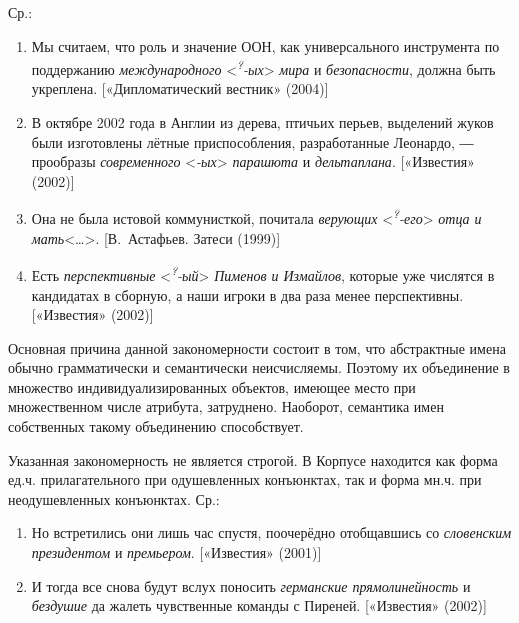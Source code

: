 Ср.:

\begin{enumerate}
\def\labelenumi{(\arabic{enumi})}
\setcounter{enumi}{127}
\item
  Мы считаем, что роль и значение ООН, как универсального инструмента по
  поддержанию \textit{международного}
  \textless{}\textit{\textsuperscript{?}-ых}\textgreater{} \textit{мира} и
  \textit{безопасности}, должна быть укреплена. {[}«Дипломатический
  вестник» (2004){]}
\item
  В октябре 2002 года в Англии из дерева, птичьих перьев, выделений
  жуков были изготовлены лётные приспособления, разработанные Леонардо,
  ― прообразы \textit{современного} \textless{}\textit{-ых}\textgreater{}
  \textit{парашюта} и \textit{дельтаплана}. {[}«Известия» (2002){]}
\item
  Она не была истовой коммунисткой, почитала \textit{верующих}
  \textless{}\textit{\textsuperscript{?}-его}\textgreater{} \textit{отца и
  мать}\textless\ldots\textgreater. {[}В.~Астафьев. Затеси (1999){]}
\item
  Есть \textit{перспективные}
  \textless{}\textit{\textsuperscript{?}-ый}\textgreater{} \textit{Пименов и
  Измайлов}, которые уже числятся в кандидатах в сборную, а наши игроки
  в два раза менее перспективны. {[}«Известия» (2002){]}
\end{enumerate}

Основная причина данной закономерности состоит в том, что абстрактные
имена обычно грамматически и семантически неисчисляемы. Поэтому их
объединение в множество индивидуализированных объектов, имеющее место
при множественном числе атрибута, затруднено. Наоборот, семантика имен
собственных такому объединению способствует.

Указанная закономерность не является строгой. В Корпусе находится как
форма ед.ч. прилагательного при одушевленных конъюнктах, так и форма
мн.ч. при неодушевленных конъюнктах. Ср.:

\begin{enumerate}
\def\labelenumi{(\arabic{enumi})}
\setcounter{enumi}{131}
\item
  Но встретились они лишь час спустя, поочерёдно отобщавшись со
  \textit{словенским президентом} и \textit{премьером}. {[}«Известия»
  (2001){]}
\item
  И тогда все снова будут вслух поносить \textit{германские
  прямолинейность} и \textit{бездушие} да жалеть чувственные команды с
  Пиреней. {[}«Известия» (2002){]}
\end{enumerate}

